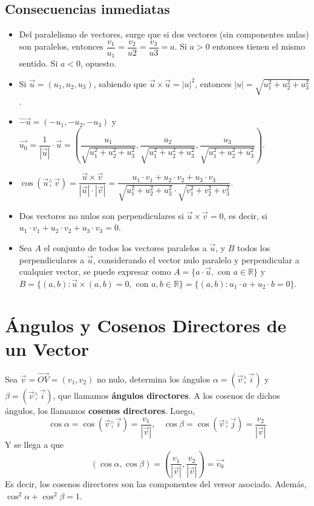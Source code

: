 \documentclass[11pt,a4paper]{article}
\begin{document}
\subsection{Consecuencias inmediatas}
\begin{itemize}
\item Del paralelismo de vectores, surge que si dos vectores (sin componentes nulas) son paralelos, entonces $\dfrac{v_1}{u_1} = \dfrac{v_2}{u2} = \dfrac{v_3}{u3} = a$. 
Si $a>0$ entonces tienen el mismo sentido. Si $a<0$, opuesto.
\item Si $\overrightarrow{u} = (u_1,u_2,u_3)$, sabiendo que $\overrightarrow{u}\times\overrightarrow{u} = |u|^2$, entonces $|u|=\sqrt{u_1^2 + u_2^2 + u_3^2}$.
\item $\overrightarrow{-u} = (-u_1, -u_2, -u_3)$ y $\overrightarrow{u_0} = \dfrac{1}{|\overrightarrow{u}|}\cdot\overrightarrow{u} = \left( \dfrac{u_1}{\sqrt{u_1^2 + u_2^2 + u_3^2}}, \dfrac{u_2}{\sqrt{u_1^2 + u_2^2 + u_3^2}}, \dfrac{u_3}{\sqrt{u_1^2 + u_2^2 + u_3^2}} \right)$.
\item $\cos(\overrightarrow{u}\overset{\wedge}{,}\overrightarrow{v}) = \dfrac{\overrightarrow{u}\times\overrightarrow{v}}{|\overrightarrow{u}|\cdot|\overrightarrow{v}|} = \dfrac{u_1 \cdot v_1 + u_2 \cdot v_2 + u_3 \cdot v_3}{\sqrt{u_1^2 + u_2^2 + u_3^2}\cdot\sqrt{v_1^2 + v_2^2 + v_3^2}}$.
\item Dos vectores no nulos son perpendiculares si $\overrightarrow{u}\times\overrightarrow{v}=0$, es decir, si $u_1 \cdot v_1 + u_2 \cdot v_2 + u_3 \cdot v_3 = 0$.
\item Sea $A$ el conjunto de todos los vectores paralelos a $\overrightarrow{u}$, y $B$ todos los perpendiculares a $\overrightarrow{u}$, considerando el vector nulo paralelo y perpendicular a cualquier vector, se puede expresar como $A=\{a\cdot\overrightarrow{u}, \text{ con $a\in\mathbb{R}$}\}$ y $B=\{(a,b) : \overrightarrow{u} \times (a,b) = 0, \text{ con $a,b\in\mathbb{R}$}\}=\{(a,b):u_1\cdot a + u_2\cdot b = 0\}$.
\end{itemize}

\section{\'Angulos y Cosenos Directores de un Vector}
\noindent Sea $\overrightarrow{v} = \overrightarrow{OV} = (v_1,v_2)$ no nulo, determina los \'angulos $\alpha=(\overrightarrow{v}\overset{\wedge}{,}\overrightarrow{i})$ y $\beta = (\overrightarrow{v}\overset{\wedge}{,}\overrightarrow{i})$, que llamamos \textbf{\'angulos directores}. A los cosenos de dichos \'angulos, los llamamos \textbf{cosenos directores}. Luego,
$$\cos \alpha = \cos (\overrightarrow{v}\overset{\wedge}{,}\overrightarrow{i}) = \dfrac{v_1}{|\overrightarrow{v}|},\ \ \ \ \cos \beta = \cos (\overrightarrow{v}\overset{\wedge}{,}\overrightarrow{j}) = \dfrac{v_2}{|\overrightarrow{v}|}$$
Y se llega a que $$(\cos \alpha, \cos \beta) = \left(\dfrac{v_1}{|\overrightarrow{v}|}, \dfrac{v_2}{|\overrightarrow{v}|}\right) = \overrightarrow{v_0}$$
Es decir, los cosenos directores son las componentes del versor asociado. Adem\'as, $\cos^2\alpha+\cos^2\beta=1$.\\
\end{document}
